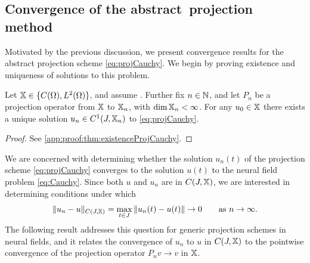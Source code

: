 \documentclass[a4paper,baskervaldx]{daarticle}
\newcommand{\rev}[1]{#1}
\begin{document}
\subsection{Convergence of the \rev{abstract} projection method}\label{sec:convergence_projection_method}
\rev{
Motivated by the previous discussion, we present convergence results for the abstract
projection scheme \cref{eq:projCauchy}. We begin by proving existence and
uniqueness of solutions to this problem.}
\begin{theorem}\label{thm:existenceProjCauchy}
  Let $\mathbb{X} \in \{C(\Omega),L^2(\Omega)\}$, and assume
  . Further fix $n \in \mathbb{N}$, and let $P_n$
  be a projection operator from $\mathbb{X}$ to $\mathbb{X}_n$, with $\dim \mathbb{X}_n < \infty$.
  For any $u_0 \in \mathbb{X}$ there exists a unique solution $u_n \in C^1(J,\mathbb{X}_n)$
to \cref{eq:projCauchy}.
\end{theorem}
\begin{proof}
  See \cref{app:proof:thm:existenceProjCauchy}.
\end{proof}

We are concerned with determining whether the solution $u_n(t)$ of the projection
scheme \cref{eq:projCauchy} converges to the solution $u(t)$ to the neural field
problem \cref{eq:Cauchy}. Since both $u$ and $u_n$ are in $C(J,\mathbb{X})$, we are
interested in determining conditions under which 
\[
  \| u_n - u \|_{C(J,\mathbb{X})} = \max_{t \in J} \| u_n(t) -u(t) \| \to 0 \qquad
  \text{as $n\to \infty$}.
\]
The following result addresses this question for generic projection schemes in neural
fields, and it relates the convergence of $u_n$ to $u$ in $C(J,\mathbb{X})$ to the
pointwise convergence of the projection operator $P_n v \to v$ in $\mathbb{X}$.
\end{document}
